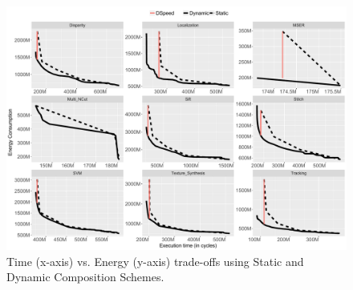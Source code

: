 \begin{figure}[t]
    \centering
	\includegraphics[width=1\textwidth]{cases-paper/graphics/pareto/pareto_best.pdf}
    \caption{Time (x-axis) vs. Energy (y-axis) trade-offs using Static and Dynamic Composition Schemes.}
    \label{fig:paretos}
	\vspace{1em}
\end{figure}

%
%

